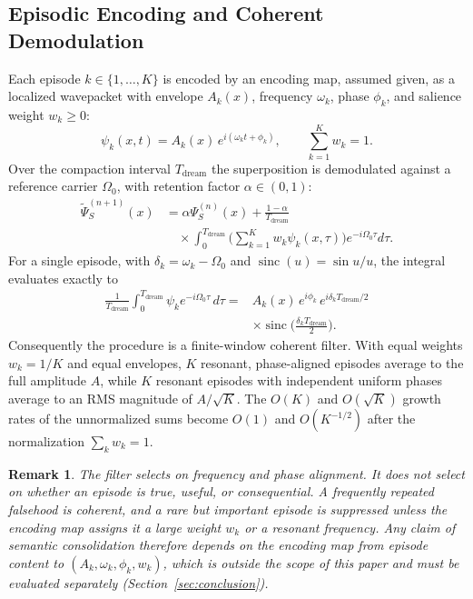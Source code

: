 \documentclass[10pt, twocolumn, a4paper]{article}
\newtheorem{remark}{Remark}
\begin{document}
\subsection{Episodic Encoding and Coherent Demodulation}\label{sec:demod}
Each episode $k \in \{1,\dots,K\}$ is encoded by an encoding map, assumed given, as a localized wavepacket with envelope $A_k(x)$, frequency $\omega_k$, phase $\phi_k$, and salience weight $w_k \ge 0$:
\begin{equation}
\psi_k(x, t) = A_k(x) \, e^{i(\omega_k t + \phi_k)}, \qquad \sum_{k=1}^{K} w_k = 1 .
\end{equation}
Over the compaction interval $T_{\text{dream}}$ the superposition is demodulated against a reference carrier $\Omega_0$, with retention factor $\alpha \in (0,1)$:
\begin{equation}
\begin{split}\widetilde{\Psi}_S^{(n+1)}(x) &= \alpha \Psi_S^{(n)}(x) + \frac{1 - \alpha}{T_{\text{dream}}}\\ &\quad\times\int_{0}^{T_{\text{dream}}} \Big( \sum_{k=1}^{K} w_k \psi_k(x, \tau) \Big) e^{-i \Omega_0 \tau} d\tau .\end{split}
\end{equation}
For a single episode, with $\delta_k = \omega_k - \Omega_0$ and $\operatorname{sinc}(u)=\sin u/u$, the integral evaluates exactly to
\begin{equation}
\begin{split}\frac{1}{T_{\text{dream}}}\int_{0}^{T_{\text{dream}}} \psi_k e^{-i\Omega_0\tau}\,d\tau = {}& A_k(x)\,e^{i\phi_k}\,e^{i\delta_k T_{\text{dream}}/2}\\ &\times\operatorname{sinc}\!\Big(\frac{\delta_k T_{\text{dream}}}{2}\Big).\end{split}
\end{equation}
Consequently the procedure is a finite-window coherent filter. With equal weights $w_k = 1/K$ and equal envelopes, $K$ resonant, phase-aligned episodes average to the full amplitude $A$, while $K$ resonant episodes with independent uniform phases average to an RMS magnitude of $A/\sqrt{K}$. The $O(K)$ and $O(\sqrt{K})$ growth rates of the unnormalized sums become $O(1)$ and $O(K^{-1/2})$ after the normalization $\sum_k w_k = 1$.

\begin{remark}
The filter selects on frequency and phase alignment. It does not select on whether an episode is true, useful, or consequential. A frequently repeated falsehood is coherent, and a rare but important episode is suppressed unless the encoding map assigns it a large weight $w_k$ or a resonant frequency. Any claim of semantic consolidation therefore depends on the encoding map from episode content to $(A_k,\omega_k,\phi_k,w_k)$, which is outside the scope of this paper and must be evaluated separately (Section~\ref{sec:conclusion}).
\end{remark}
\end{document}

